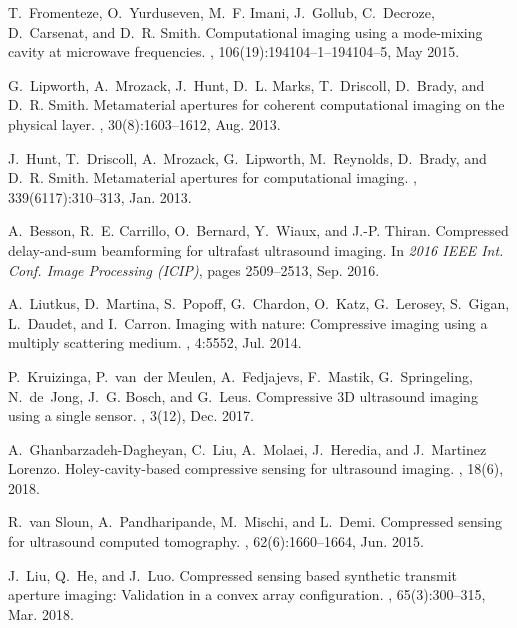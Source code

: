 \documentclass[10pt,twocolumn,romanappendices,final]{IEEEtran}
\begin{document}
\begin{thebibliography}{100}
T.~Fromenteze, O.~Yurduseven, M.~F. Imani, J.~Gollub, C.~Decroze, D.~Carsenat,
  and D.~R. Smith.
\newblock Computational imaging using a mode-mixing cavity at microwave
  frequencies.
, 106(19):194104--1--194104--5, May 2015.

G.~Lipworth, A.~Mrozack, J.~Hunt, D.~L. Marks, T.~Driscoll, D.~Brady, and D.~R.
  Smith.
\newblock Metamaterial apertures for coherent computational imaging on the
  physical layer.
, 30(8):1603--1612, Aug. 2013.

J.~Hunt, T.~Driscoll, A.~Mrozack, G.~Lipworth, M.~Reynolds, D.~Brady, and D.~R.
  Smith.
\newblock Metamaterial apertures for computational imaging.
, 339(6117):310--313, Jan. 2013.

A.~Besson, R.~E. Carrillo, O.~Bernard, Y.~Wiaux, and J.-P. Thiran.
\newblock Compressed delay-and-sum beamforming for ultrafast ultrasound
  imaging.
\newblock In {\em 2016 IEEE Int. Conf. Image Processing (ICIP)}, pages
  2509--2513, Sep. 2016.

A.~Liutkus, D.~Martina, S.~Popoff, G.~Chardon, O.~Katz, G.~Lerosey, S.~Gigan,
  L.~Daudet, and I.~Carron.
\newblock Imaging with nature: {C}ompressive imaging using a multiply
  scattering medium.
, 4:5552, Jul. 2014.

P.~Kruizinga, P.~van~der Meulen, A.~Fedjajevs, F.~Mastik, G.~Springeling,
  N.~de~Jong, J.~G. Bosch, and G.~Leus.
\newblock Compressive {3D} ultrasound imaging using a single sensor.
, 3(12), Dec. 2017.

A.~Ghanbarzadeh-Dagheyan, C.~Liu, A.~Molaei, J.~Heredia, and J.~Martinez
  Lorenzo.
\newblock Holey-cavity-based compressive sensing for ultrasound imaging.
, 18(6), 2018.

R.~{van Sloun}, A.~Pandharipande, M.~Mischi, and L.~Demi.
\newblock Compressed sensing for ultrasound computed tomography.
, 62(6):1660--1664, Jun. 2015.

J.~Liu, Q.~He, and J.~Luo.
\newblock Compressed sensing based synthetic transmit aperture imaging:
  {V}alidation in a convex array configuration.
,
  65(3):300--315, Mar. 2018.


\end{thebibliography}
\end{document}
